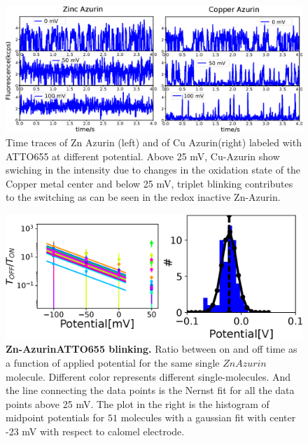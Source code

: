 \documentclass[11pt,a4paper,onecolumn]{article}
\begin{document}
\begin{figure}
  \centering
  \includegraphics[width=\textwidth,keepaspectratio]{Figure_SI/SI_timetrace_Zn_Cu.eps}
	\makeatletter
	\renewcommand{\fnum@figure}{\figurename~S\thefigure}
	\makeatother
  \caption{Time traces of Zn Azurin (left) and of Cu Azurin(right) labeled with ATTO655 at different potential.  Above 25 mV, Cu-Azurin show swiching in the intensity due to changes in the oxidation state of the Copper metal center and below 25 mV, triplet blinking contributes to the switching as can be seen in the redox inactive Zn-Azurin.}
  \label{SIfig:tracecomparision}
\end{figure}
\begin{figure}
  \centering
  \includegraphics[width=\textwidth,keepaspectratio]{Figure_SI/SI_potential_Zn.eps}
	\makeatletter
	\renewcommand{\fnum@figure}{\figurename~S\thefigure}
	\makeatother
  \caption{\textbf{Zn-AzurinATTO655 blinking.} Ratio between on and off time as a function of applied potential for the same single $ZnAzurin$ molecule. Different color represents different single-molecules. And the line connecting the data points is the Nernst fit for all the data points above 25 mV. The plot in the right is the histogram of midpoint potentials for $51$ molecules with a gaussian fit with center -23 mV with respect to calomel electrode.}
  \label{SIfig:2Dhist_Zn}
\end{figure}
\end{document}
